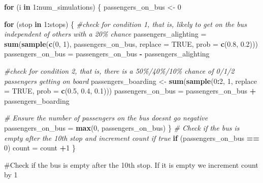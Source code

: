 \documentclass[
]{article}
\newenvironment{Shaded}{\begin{snugshade}}{\end{snugshade}}
\newcommand{\AttributeTok}[1]{\textcolor[rgb]{0.13,0.29,0.53}{#1}}
\newcommand{\CommentTok}[1]{\textcolor[rgb]{0.56,0.35,0.01}{\textit{#1}}}
\newcommand{\ConstantTok}[1]{\textcolor[rgb]{0.56,0.35,0.01}{#1}}
\newcommand{\ControlFlowTok}[1]{\textcolor[rgb]{0.13,0.29,0.53}{\textbf{#1}}}
\newcommand{\DecValTok}[1]{\textcolor[rgb]{0.00,0.00,0.81}{#1}}
\newcommand{\FloatTok}[1]{\textcolor[rgb]{0.00,0.00,0.81}{#1}}
\newcommand{\FunctionTok}[1]{\textcolor[rgb]{0.13,0.29,0.53}{\textbf{#1}}}
\newcommand{\NormalTok}[1]{#1}
\newcommand{\OtherTok}[1]{\textcolor[rgb]{0.56,0.35,0.01}{#1}}
\newcommand{\SpecialCharTok}[1]{\textcolor[rgb]{0.81,0.36,0.00}{\textbf{#1}}}
\begin{document}
\begin{Shaded}
\begin{Highlighting}[]
\ControlFlowTok{for}\NormalTok{ (i }\ControlFlowTok{in} \DecValTok{1}\SpecialCharTok{:}\NormalTok{num\_simulations) \{}
\NormalTok{  passengers\_on\_bus }\OtherTok{\textless{}{-}} \DecValTok{0}
  
  \ControlFlowTok{for}\NormalTok{ (stop }\ControlFlowTok{in} \DecValTok{1}\SpecialCharTok{:}\NormalTok{stops) \{}
    \CommentTok{\#check for condition 1, that is, likely to get on the bus independent of others with a 20\% chance}
\NormalTok{    passengers\_alighting }\OtherTok{=} \FunctionTok{sum}\NormalTok{(}\FunctionTok{sample}\NormalTok{(}\FunctionTok{c}\NormalTok{(}\DecValTok{0}\NormalTok{, }\DecValTok{1}\NormalTok{), passengers\_on\_bus, }\AttributeTok{replace =} \ConstantTok{TRUE}\NormalTok{, }\AttributeTok{prob =} \FunctionTok{c}\NormalTok{(}\FloatTok{0.8}\NormalTok{, }\FloatTok{0.2}\NormalTok{)))}
\NormalTok{    passengers\_on\_bus }\OtherTok{=}\NormalTok{ passengers\_on\_bus }\SpecialCharTok{{-}}\NormalTok{ passengers\_alighting }
    
    \CommentTok{\#check for condition 2, that is, there is a 50\%/40\%/10\% chance of 0/1/2 passengers getting on board}
\NormalTok{    passengers\_boarding }\OtherTok{\textless{}{-}} \FunctionTok{sum}\NormalTok{(}\FunctionTok{sample}\NormalTok{(}\DecValTok{0}\SpecialCharTok{:}\DecValTok{2}\NormalTok{, }\DecValTok{1}\NormalTok{, }\AttributeTok{replace =} \ConstantTok{TRUE}\NormalTok{, }\AttributeTok{prob =} \FunctionTok{c}\NormalTok{(}\FloatTok{0.5}\NormalTok{, }\FloatTok{0.4}\NormalTok{, }\FloatTok{0.1}\NormalTok{)))}
\NormalTok{    passengers\_on\_bus }\OtherTok{=}\NormalTok{ passengers\_on\_bus }\SpecialCharTok{+}\NormalTok{ passengers\_boarding}
    
    \CommentTok{\# Ensure the number of passengers on the bus doesn\textquotesingle{}t go negative}
\NormalTok{    passengers\_on\_bus }\OtherTok{=} \FunctionTok{max}\NormalTok{(}\DecValTok{0}\NormalTok{, passengers\_on\_bus)}
\NormalTok{  \}}
  \CommentTok{\# Check if the bus is empty after the 10th stop and increment count if true}
  \ControlFlowTok{if}\NormalTok{ (passengers\_on\_bus }\SpecialCharTok{==} \DecValTok{0}\NormalTok{) }
\NormalTok{    count }\OtherTok{=}\NormalTok{ count }\SpecialCharTok{+}\DecValTok{1}
\NormalTok{\}}
\end{Highlighting}
\end{Shaded}

\#Check if the bus is empty after the 10th stop. If it is empty we
increment count by 1
\end{document}
